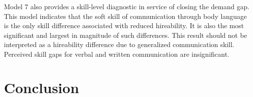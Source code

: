 \documentclass[review]{elsarticle}
\begin{document}


Model 7 also provides a skill-level diagnostic in service of closing the demand gap.
This model indicates that the soft skill of communication through body language is the only skill difference associated with reduced hireability.
It is also the most significant and largest in magnitude of such differences.
This result should not be interpreted as a hireability difference due to generalized communication skill.
Perceived skill gaps for verbal and written communication are insignificant.

\section{Conclusion}

\end{document}
